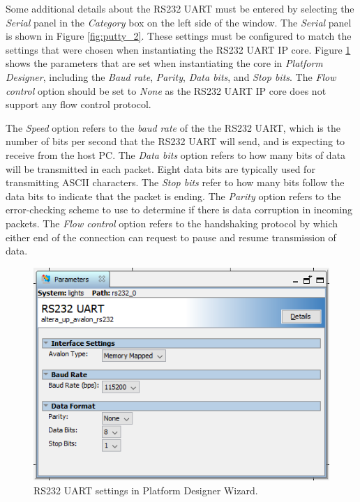 \documentclass[11pt, twoside, pdftex]{article}
\begin{document}
Some additional details about the RS232 UART must be entered by selecting the \textit{Serial} panel in the \textit{Category} box on the left side of the window. The \textit{Serial} panel is shown in Figure \ref{fig:putty_2}. These settings must be configured to match the settings that were chosen when instantiating the RS232 UART IP core. Figure \ref{fig:putty_3} shows the parameters that are set when instantiating the core in \textit{Platform Designer}, including the \textit{Baud rate}, \textit{Parity}, \textit{Data bits}, and \textit{Stop bits}. The \textit{Flow control} option should be set to \textit{None} as the RS232 UART IP core does not support any flow control protocol.

The \textit{Speed} option refers to the \textit{baud rate} of the the RS232 UART, which is the number of bits per second that the RS232 UART will send, and is expecting to receive from the host PC. The \textit{Data bits} option refers to how many bits of data will be transmitted in each packet. Eight data bits are typically used for transmitting ASCII characters. The \textit{Stop bits} refer to how many bits follow the data bits to indicate that the packet is ending. The \textit{Parity} option refers to the error-checking scheme to use to determine if there is data corruption in incoming packets. The \textit{Flow control} option refers to the handshaking protocol by which either end of the connection can request to pause and resume transmission of data. 

\begin{figure}[h!]
   \begin{center}
       \includegraphics[scale=0.7]{figures/fig_putty_tut_3}
   \end{center}
   \caption{RS232 UART settings in Platform Designer Wizard.}
	\label{fig:putty_3}
\end{figure}
\end{document}

